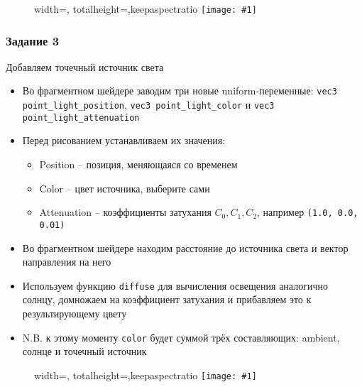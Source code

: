 \documentclass{beamer}
\newcommand{\slideimage}[1]{
  \begin{figure}
    \begin{adjustbox}{width=\textwidth, totalheight=\textheight-2\baselineskip-2\baselineskip,keepaspectratio}
      \texttt{[image: \#1]}
    \end{adjustbox}
  \end{figure}
}
\begin{document}
\begin{frame}[fragile]
\slideimage{2.png}
\end{frame}

\begin{frame}[fragile]
\frametitle{Задание 3}
Добавляем точечный источник света
\begin{itemize}
\item Во фрагментном шейдере заводим три новые uniform-переменные: \verb|vec3 point_light_position|, \verb|vec3 point_light_color| и \verb|vec3 point_light_attenuation|
\item Перед рисованием устанавливаем их значения:
\begin{itemize}
\item Position -- позиция, меняющаяся со временем
\item Color -- цвет источника, выберите сами
\item Attenuation -- коэффициенты затухания \begin{math}C_0, C_1, C_2\end{math}, например \verb|(1.0, 0.0, 0.01)|
\end{itemize}
\item Во фрагментном шейдере находим расстояние до источника света и вектор направления на него
\item Используем функцию \verb|diffuse| для вычисления освещения аналогично солнцу, домножаем на коэффициент затухания и прибавляем это к результирующему цвету
\item N.B. к этому моменту \verb|color| будет суммой трёх составляющих: ambient, солнце и точечный источник
\end{itemize}
\end{frame}

\begin{frame}[fragile]
\slideimage{3.png}
\end{frame}
\end{document}
